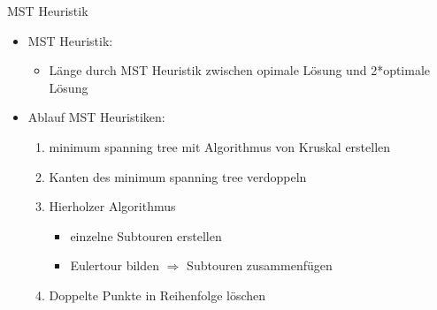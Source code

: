 \begin{frame}{MST Heuristik}
	\begin{itemize}
		\item MST Heuristik:
      \begin{itemize}
      	\item Länge durch MST Heuristik zwischen opimale Lösung und 2*optimale Lösung
      \end{itemize}
      \vspace{1cm}
      	\item Ablauf MST Heuristiken:
        \begin{enumerate}
        	\item minimum spanning tree mit Algorithmus von Kruskal erstellen 
            \item Kanten des minimum spanning tree verdoppeln
            \item Hierholzer Algorithmus
            \begin{itemize}
            \item einzelne Subtouren erstellen
            \item Eulertour bilden $\Rightarrow$ Subtouren zusammenfügen
            \end{itemize}
            \item Doppelte Punkte in Reihenfolge löschen
        \end{enumerate}
	\end{itemize}
\end{frame}

